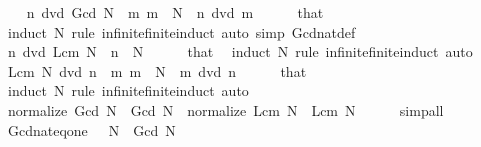 \begin{isabellebody}
\ \ \isamarkupfalse%
\ {\isachardoublequoteopen}n\ dvd\ Gcd\ N{\isachardoublequoteclose}\ \ {\isachardoublequoteopen}{\isasymAnd}m{\isachardot}{\kern0pt}\ m\ {\isasymin}\ N\ {\isasymLongrightarrow}\ n\ dvd\ m{\isachardoublequoteclose}\isanewline
\ \ \ \ \isamarkupfalse%
\ that\ \isamarkupfalse%
\ {\isacharparenleft}{\kern0pt}induct\ N\ rule{\isacharcolon}{\kern0pt}\ infinite{\isacharunderscore}{\kern0pt}finite{\isacharunderscore}{\kern0pt}induct{\isacharparenright}{\kern0pt}\ {\isacharparenleft}{\kern0pt}auto\ simp{\isacharcolon}{\kern0pt}\ Gcd{\isacharunderscore}{\kern0pt}nat{\isacharunderscore}{\kern0pt}def{\isacharparenright}{\kern0pt}\isanewline
\ \ \isamarkupfalse%
\ {\isachardoublequoteopen}n\ dvd\ Lcm\ N{\isachardoublequoteclose}\ \ {\isachardoublequoteopen}n\ {\isasymin}\ N{\isachardoublequoteclose}\isanewline
\ \ \ \ \isamarkupfalse%
\ that\ \isamarkupfalse%
\ {\isacharparenleft}{\kern0pt}induct\ N\ rule{\isacharcolon}{\kern0pt}\ infinite{\isacharunderscore}{\kern0pt}finite{\isacharunderscore}{\kern0pt}induct{\isacharparenright}{\kern0pt}\ auto\isanewline
\ \ \isamarkupfalse%
\ {\isachardoublequoteopen}Lcm\ N\ dvd\ n{\isachardoublequoteclose}\ \ {\isachardoublequoteopen}{\isasymAnd}m{\isachardot}{\kern0pt}\ m\ {\isasymin}\ N\ {\isasymLongrightarrow}\ m\ dvd\ n{\isachardoublequoteclose}\isanewline
\ \ \ \ \isamarkupfalse%
\ that\ \isamarkupfalse%
\ {\isacharparenleft}{\kern0pt}induct\ N\ rule{\isacharcolon}{\kern0pt}\ infinite{\isacharunderscore}{\kern0pt}finite{\isacharunderscore}{\kern0pt}induct{\isacharparenright}{\kern0pt}\ auto\isanewline
\ \ \isamarkupfalse%
\ {\isachardoublequoteopen}normalize\ {\isacharparenleft}{\kern0pt}Gcd\ N{\isacharparenright}{\kern0pt}\ {\isacharequal}{\kern0pt}\ Gcd\ N{\isachardoublequoteclose}\ \ {\isachardoublequoteopen}normalize\ {\isacharparenleft}{\kern0pt}Lcm\ N{\isacharparenright}{\kern0pt}\ {\isacharequal}{\kern0pt}\ Lcm\ N{\isachardoublequoteclose}\isanewline
\ \ \ \ \isamarkupfalse%
\ simp{\isacharunderscore}{\kern0pt}all\isanewline
{}\isamarkupfalse%
%
\endisatagproof
{\isafoldproof}%
%
\isadelimproof
\isanewline
%
\endisadelimproof
\isanewline
{}\isamarkupfalse%
\isanewline
\isanewline
{}\isamarkupfalse%
\ Gcd{\isacharunderscore}{\kern0pt}nat{\isacharunderscore}{\kern0pt}eq{\isacharunderscore}{\kern0pt}one{\isacharcolon}{\kern0pt}\ {\isachardoublequoteopen}{}\ {\isasymin}\ N\ {\isasymLongrightarrow}\ Gcd\ N\ {\isacharequal}{\kern0pt}\ {}{\isachardoublequoteclose}\isanewline

\end{isabellebody}
